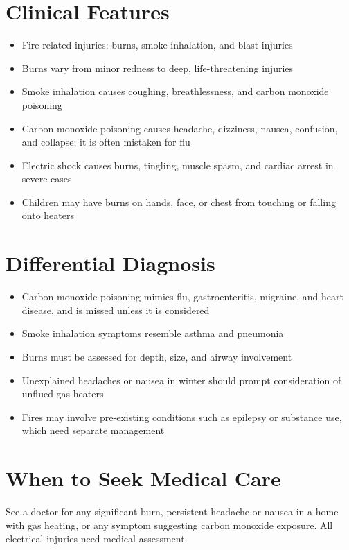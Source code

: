 \section*{Clinical Features}
\begin{itemize}
    \item Fire-related injuries: burns, smoke inhalation, and blast injuries
    \item Burns vary from minor redness to deep, life-threatening injuries
    \item Smoke inhalation causes coughing, breathlessness, and carbon monoxide poisoning
    \item Carbon monoxide poisoning causes headache, dizziness, nausea, confusion, and collapse; it is often mistaken for flu
    \item Electric shock causes burns, tingling, muscle spasm, and cardiac arrest in severe cases
    \item Children may have burns on hands, face, or chest from touching or falling onto heaters
\end{itemize}

\section*{Differential Diagnosis}
\begin{itemize}
    \item Carbon monoxide poisoning mimics flu, gastroenteritis, migraine, and heart disease, and is missed unless it is considered
    \item Smoke inhalation symptoms resemble asthma and pneumonia
    \item Burns must be assessed for depth, size, and airway involvement
    \item Unexplained headaches or nausea in winter should prompt consideration of unflued gas heaters
    \item Fires may involve pre-existing conditions such as epilepsy or substance use, which need separate management
\end{itemize}

\section*{When to Seek Medical Care}
See a doctor for any significant burn, persistent headache or nausea in a home with gas heating, or any symptom suggesting carbon monoxide exposure. All electrical injuries need medical assessment.


